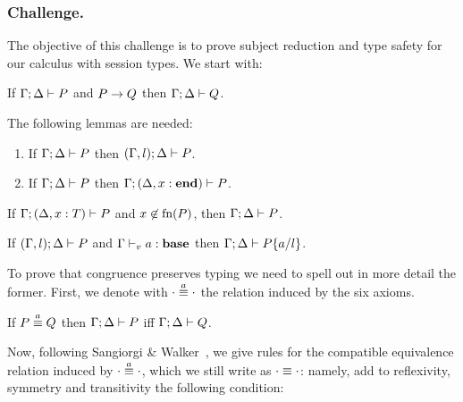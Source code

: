 \documentclass[runningheads]{llncs}
\begin{document}
\subsubsection{Challenge.}
The objective of this challenge is to prove subject reduction and type safety for our calculus with session types. We start with:
\begin{theorem}
  If \( \types{\Gamma;\Delta}{P} \) and \( \reduces{P}{Q} \) then \( \types{\Gamma;\Delta}{Q} \).
\end{theorem}

The following lemmas are needed:
\begin{lemma}[Weakening]\mbox{}
  \label{lemma:weak}
  \begin{enumerate}
  \item If \( \types{\Gamma; \Delta}{P} \) then
    \( \types{(\Cadd{\Gamma}{l});\Delta}{P} \).
  \item If \( \types{\Gamma; \Delta}{P} \) %
    then \( \types{\Gamma;(\Cadd{\Delta}{\hastype{x}{\Tend}})}{P} \).
  \end{enumerate}
\end{lemma}

\begin{lemma}[Strengthening]\mbox{}
  \label{lemma:strenD}
  If \( \types{\Gamma; (\Cadd{\Delta}{\hastype{x}{T}})}{P} \) and
  $x\not\in \freenames{P}$, then \( \types{\Gamma; \Delta}{P} \).
\end{lemma}

\begin{lemma}[Substitution]\mbox{}
  \label{le:subst}
  If $\types{(\Cadd{\Gamma}{l});\Delta}{P}$ and
  ${\typev{\Gamma}{\hastype{a}{\Tbase}}}$ then
  \( \types{\Gamma;\Delta}{\subst{P}{a}{l}} \).
\end{lemma}

To prove that congruence preserves typing we need to spell out in more detail the former. First, we denote with $\sconga\cdot\cdot$ the relation induced by the six axioms.

\begin{lemma}
  \label{le:presequiva}
  If \( \sconga{P}{Q} \) then \( \types{\Gamma;\Delta}{P} \)  iff \( \types{\Gamma;\Delta}{Q} \).
\end{lemma}

Now, following Sangiorgi \& Walker~\cite{picalcbook}, we give rules for the compatible
equivalence relation induced by $\sconga\cdot\cdot$, which we still
write as $\scong\cdot\cdot$: namely, add to reflexivity, symmetry and
transitivity the following condition:
 \begin{mathpar}
 \end{mathpar}
\end{document}
